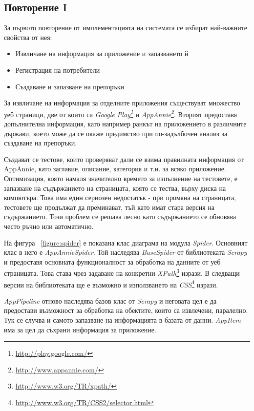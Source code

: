 	\subsection{Повторение I}
	
		За първото повторение от имплементацията на системата се избират най-важните свойства от нея:
		
		\begin{itemize}
			\item Извличане на информация за приложение и запазването й
			\item Регистрация на потребители
			\item Създаване и запазване на препоръки
		\end{itemize}
		
		За извличане на информация за отделните приложения съществуват множество уеб страници, две от които са \emph{Google Play\footnote{\url{http://play.google.com/}}} и \emph{AppAnnie\footnote{\url{http://www.appannie.com/}}}. Вторият предоставя допълнителна информация, като например ранкът на приложението в различните държави, което може да се окаже предимство при по-задълбочен анализ за създаване на препоръки.
		
		Създават се тестове, които проверяват дали се взима правилната информация от AppAnnie, като заглавие, описание, категория и т.н. за всяко приложение. Оптимизация, която намаля значително времето за изпълнение на тестовете, е запазване на съдържанието на страницата, която се тества, върху диска на компютъра. Това има един сериозен недостатък - при промяна на страницата, тестовете ще продължат да преминават, тъй като имат стара версия на съдържанието. Този проблем се решава лесно като съдържанието се обновява често ръчно или автоматично.
		
		На фигура ~\ref{figure:spider} е показана клас диаграма на модула \emph{Spider}. Основният клас в него е \emph{AppAnnieSpider}. Той наследява \emph{BaseSpider} от библиотеката \emph{Scrapy} и предоставя основната функционалност за обработка на данните от уеб страницата. Това става чрез задаване на конкретни \emph{XPath}\footnote{\url{http://www.w3.org/TR/xpath/}} изрази. В следващи версии на библиотеката ще е възможно и използването на \emph{CSS}\footnote{\url{http://www.w3.org/TR/CSS2/selector.html}} изрази.
		
		\emph{AppPipeline} отново наследява базов клас от \emph{Scrapy} и неговата цел е да предостави възможност за обработка на обектите, които са извлечени, паралелно. Тук се случва и самото запазване на информацията в базата от данни. \emph{AppItem} има за цел да съхрани информация за приложение.
		

